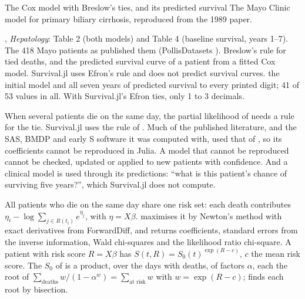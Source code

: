 



  {The Cox model with Breslow's ties, and its predicted survival}
  {The Mayo Clinic model for primary biliary cirrhosis, reproduced from the 1989 paper.}

\factsheet
  {, \emph{Hepatology}: Table 2 (both models) and Table 4 (baseline
   survival, years 1--7). The 418 Mayo patients as  published them (PollisDatasets ).}
  {Breslow's rule for tied deaths, and the predicted survival curve of a patient from a fitted Cox model. Survival.jl uses
   Efron's rule and does not predict survival curves.}
  {}
  {the initial model and all seven years of predicted survival to every printed digit; 41 of 53 values in all. With
   Survival.jl's Efron ties, only 1 to 3 decimals.}

When several patients die on the same day, the partial likelihood of  needs a rule for the tie. Survival.jl uses the rule of
. Much of the published literature, and the SAS, BMDP and early S software it was computed with, used that of ,
so its coefficients cannot be reproduced in Julia. A model that cannot be reproduced cannot be checked, updated or applied
to new patients with confidence. And a clinical model is used through its predictions: ``what is this patient's chance of
surviving five years?'', which Survival.jl does not compute.

All patients who die on the same day share one risk set: each death contributes
$\eta_i - \log \sum_{j \in R(t_i)} e^{\eta_j}$, with $\eta = X\beta$.  maximises it by Newton's method with exact
derivatives from ForwardDiff, and returns coefficients, standard errors from the inverse information, Wald chi-squares and
the likelihood ratio chi-square.
A patient with risk score $R = X\beta$ has $S(t, R) = S_0(t)^{\exp(R - c)}$, $c$ the mean risk score. The $S_0$ of  is a product, over the days with deaths, of factors $\alpha$, each the root of
$\sum_{\text{deaths}} w/(1-\alpha^w) = \sum_{\text{at risk}} w$ with $w = \exp(R - c)$;  finds each root by bisection.

